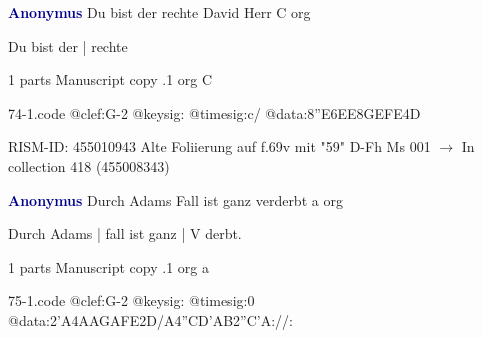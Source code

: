 \documentclass[twocolumn]{book}
\begin{document}
\newline \par \vspace{7pt} \textcolor{darkblue}{\textbf{Anonymus  }}
\newline Du bist der rechte David Herr  C  
\newline org
\newline \begin{itshape}[f.69v, at left:] Du bist der | rechte\end{itshape} 
\newline \textcolor{darkblue}{}  1 parts  
\newline Manuscript copy
.1  org  C  
\begin{filecontents*}{74-1.code}
@clef:G-2
@keysig:
@timesig:c/
@data:{8''E6EE8GE}{FE}4D
\end{filecontents*}
\newline
%

\newline RISM-ID: 455010943
\newline Alte Foliierung auf f.69v mit "59"
\newline D-Fh  Ms 001
\newline $\rightarrow$ In collection 418 (455008343)

\newline \par \vspace{7pt} \textcolor{darkblue}{\textbf{Anonymus  }}
\newline Durch Adams Fall ist ganz verderbt  a  
\newline org
\newline \begin{itshape}[f.21v, at left:] Durch Adams | fall ist ganz | V derbt.\end{itshape} 
\newline \textcolor{darkblue}{}  1 parts  
\newline Manuscript copy
.1  org  a  
\begin{filecontents*}{75-1.code}
@clef:G-2
@keysig:
@timesig:0
@data:2'A4AAGAFE2D/A4''CD'AB2''C'A://:
\end{filecontents*}
\newline
%
\end{document}
